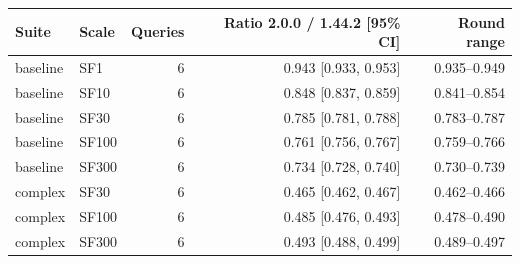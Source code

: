 \begin{tabular}{llrrr}
\toprule
Suite & Scale & Queries & Ratio 2.0.0 / 1.44.2 [95\% CI] & Round range \\
\midrule
baseline & SF1 & 6 & 0.943 [0.933, 0.953] & 0.935--0.949 \\
baseline & SF10 & 6 & 0.848 [0.837, 0.859] & 0.841--0.854 \\
baseline & SF30 & 6 & 0.785 [0.781, 0.788] & 0.783--0.787 \\
baseline & SF100 & 6 & 0.761 [0.756, 0.767] & 0.759--0.766 \\
baseline & SF300 & 6 & 0.734 [0.728, 0.740] & 0.730--0.739 \\
complex & SF30 & 6 & 0.465 [0.462, 0.467] & 0.462--0.466 \\
complex & SF100 & 6 & 0.485 [0.476, 0.493] & 0.478--0.490 \\
complex & SF300 & 6 & 0.493 [0.488, 0.499] & 0.489--0.497 \\
\bottomrule
\end{tabular}
